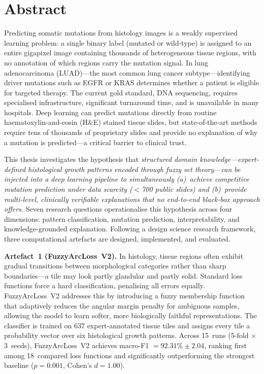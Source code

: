 \chapter*{Abstract}

Predicting somatic mutations from histology images is a weakly
supervised learning problem: a single binary label (mutated or
wild-type) is assigned to an entire gigapixel image containing
thousands of heterogeneous tissue regions, with no annotation of
which regions carry the mutation signal.
In lung adenocarcinoma (LUAD)---the most common lung cancer
subtype---identifying driver mutations such as EGFR or KRAS
determines whether a patient is eligible for targeted therapy.
The current gold standard, DNA sequencing, requires specialised
infrastructure, significant turnaround time, and is unavailable in
many hospitals.
Deep learning can predict mutations directly from routine
haematoxylin-and-eosin (H\&E) stained tissue slides, but
state-of-the-art methods require tens of thousands of proprietary
slides and provide no explanation of why a mutation is predicted---a
critical barrier to clinical trust.

This thesis investigates the hypothesis that \emph{structured domain
knowledge---expert-defined histological growth patterns encoded
through fuzzy set theory---can be injected into a deep learning
pipeline to simultaneously (a)~achieve competitive mutation prediction
under data scarcity ($<$700 public slides) and (b)~provide
multi-level, clinically verifiable explanations that no end-to-end
black-box approach offers.}
Seven research questions operationalise this hypothesis across four
dimensions: pattern classification, mutation prediction,
interpretability, and knowledge-grounded explanation.
Following a design science research framework, three computational
artefacts are designed, implemented, and evaluated.

\textbf{Artefact~1 (FuzzyArcLoss~V2).}
In histology, tissue regions often exhibit gradual transitions
between morphological categories rather than sharp boundaries---a
tile may look partly glandular and partly solid.
Standard loss functions force a hard classification, penalising
all errors equally.
FuzzyArcLoss~V2 addresses this by introducing a fuzzy membership
function that adaptively reduces the angular margin penalty for
ambiguous samples, allowing the model to learn softer, more
biologically faithful representations.
The classifier is trained on 637 expert-annotated tissue tiles
and assigns every tile a probability vector over six histological
growth patterns.
Across 15~runs (5-fold $\times$ 3~seeds), FuzzyArcLoss~V2 achieves
macro-F1 $= 92.31\% \pm 2.04$, ranking first among 18~compared loss
functions and significantly outperforming the strongest baseline
($p = 0.001$, Cohen's $d = 1.00$).

